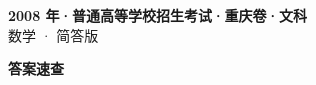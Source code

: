 \documentclass[zihao=-4, a4paper]{ctexart}
\begin{document}
\begin{center}
  {\Large\bfseries 2008 年·普通高等学校招生考试·重庆卷·文科}\\[4pt]
  {\large 数学 · 简答版}
\end{center}
\medskip
{}

\clearpage
{}
\begin{center}{\Large\bfseries 答案速查}\end{center}
\medskip

\end{document}
